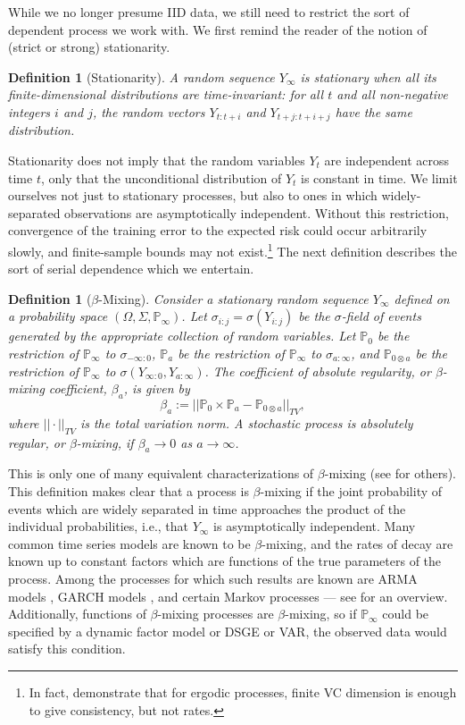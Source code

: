 \documentclass[12pt, oneside, a4paper]{article}
\theoremstyle{plain}
\newtheorem{definition}[theorem]{Definition}
\renewcommand{\P}{\mathbb{P}}
\newcommand{\Yij}[2]{Y_{#1:#2}}
\newcommand{\Sij}[2]{\sigma_{#1:#2}}
\newcommand{\Yinf}{Y_\infty}
\newcommand{\Pinf}{\P_\infty}
\theoremstyle{definition}
\begin{document}
While we no longer presume IID data, we still need to restrict the sort of dependent
process we work with.  We first remind the reader of the notion of (strict or
strong) stationarity.
\begin{definition}[Stationarity]\label{def:stationary}
  A random sequence $\Yinf$ is stationary when all its finite-dimensional
  distributions are time-invariant: for all $t$ and all non-negative integers
  $i$ and $j$, the random vectors $\Yij{t}{t+i}$ and $\Yij{t+j}{t+i+j}$ have
  the same distribution.
\end{definition}
Stationarity does not imply that the random variables $Y_t$ are independent
across time $t$, only that the unconditional distribution of $Y_t$ is constant
in time.  We limit ourselves not just to stationary processes, but also to ones
in which widely-separated observations are asymptotically independent.  Without
this restriction, convergence of the training error to the expected risk could
occur arbitrarily slowly, and finite-sample bounds may not exist.\footnote{In
  fact, \cite{AdamsNobel2010} demonstrate that for ergodic processes, finite
  VC dimension is enough to give consistency, but not rates.}  The next
definition describes the sort of serial dependence which we entertain.
\begin{definition}[$\beta$-Mixing]
  \label{defn:beta-mix}
  Consider a stationary random sequence $\Yinf$ defined on
  a probability space $(\Omega, \Sigma, \Pinf)$. Let $\Sij{i}{j}=\sigma(\Yij{i}{j})$ be the $\sigma$-field of events
  generated by the appropriate collection of random variables.  Let $\P_0$ be
  the restriction of $\Pinf$ to $\Sij{-\infty}{0}$, $\P_{a}$ be the
  restriction of $\Pinf$ to $\Sij{a}{\infty}$, and $\P_{0\otimes a}$ be the
  restriction of $\Pinf$ to
  $\sigma(\Yij{\infty}{0},\Yij{a}{\infty})$.  The {\em
    coefficient of absolute regularity}, or {\em $\beta$-mixing coefficient},
  $\beta_a$, is given by
\begin{equation}
  \label{eq:three}
  \beta_a := ||\P_0 \times \P_{a} - \P_{0 \otimes
    a}||_{TV}, 
\end{equation}
where $|| \cdot ||_{TV}$ is the total variation norm. A stochastic process is
{\em absolutely regular}, or {\em $\beta$-mixing}, if $\beta_a \rightarrow 0$
as $a\rightarrow\infty$.
\end{definition}
This is only one of many equivalent characterizations of $\beta$-mixing (see
\cite{Bradley2005} for others).  This definition makes clear that a process is
$\beta$-mixing if the joint probability of events which are widely separated in
time approaches the product of the individual probabilities, i.e., that $\Yinf$
is asymptotically independent.  Many common time series models are known to be
$\beta$-mixing, and the rates of decay are known up to constant factors which
are functions of the true parameters of the process.  Among the processes for
which such results are known are ARMA models \cite{Mokkadem1988}, GARCH models
\cite{CarrascoChen2002}, and certain Markov processes --- see
\cite{doukhan1994mixing} for an overview.  Additionally, functions of $\beta$-mixing
processes are $\beta$-mixing, so if $\Pinf$ could be specified by a dynamic
factor model or DSGE or VAR, the observed data would satisfy this condition.
\end{document}
